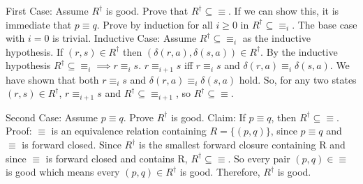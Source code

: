 \documentclass[12pt]{article}
\begin{document}
\medskip

First Case: Assume $R^{\dagger}$ is good. Prove that $R^{\dagger} \subseteq \equiv$.
If we can show this, it is immediate that $p \equiv q$. Prove by induction for 
all $i \ge 0$ in $R^{\dagger} \subseteq \equiv_i$. 
\newline
The base case with $i=0$ is trivial.
\newline
Inductive Case: Assume $R^{\dagger} \subseteq \equiv_i$ as the inductive hypothesis. \newline
If $(r,s) \in R^{\dagger}$ then $(\delta(r, a), \delta(s, a)) \in R^{\dagger}$.
By the inductive hypothesis $R^{\dagger} \subseteq \equiv_i \implies r \equiv_i
s$. \newline
$r \equiv_{i+1} s$ iff $r \equiv_{i} s$ and $\delta(r, a) \equiv_{i} \delta(s, a)$. We have shown that both $r \equiv_{i} s$ and 
$\delta(r, a) \equiv_{i} \delta(s, a)$ hold. So, for any two states $(r,s) \in
R^{\dagger}$, $r \equiv_{i+1} s$ and $R^{\dagger} \subseteq \equiv_{i+1}$, 
so $R^{\dagger} \subseteq \equiv$.

\medskip

Second Case: Assume $p \equiv q$. Prove $R^{\dagger}$ is good. \newline
Claim: If $p \equiv q$, then $R^{\dagger} \subseteq \equiv$.  \newline
Proof: $\equiv$ is an equivalence relation containing $R=\{(p,q)\}$, since 
$p \equiv q$ and $\equiv$ is forward closed. Since $R^{\dagger}$ is the smallest
forward closure containing R and since $\equiv$ is forward closed and contains R, $R^{\dagger} \subseteq \equiv$. \newline
So every pair $(p,q) \in \equiv$ is good which means every $(p,q) \in R^{\dagger}$ is good. Therefore, $R^{\dagger}$ is good.
\end{document}
